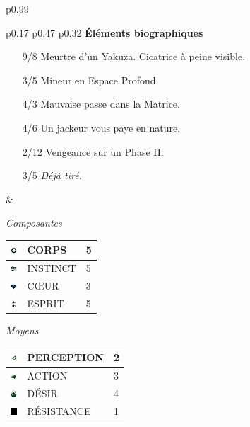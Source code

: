 \documentclass[11pt,twoside,a4paper]{article}
\def\imgCORPS{\includegraphics[width=0.25cm]{../../../../../imgGraphics/rolePlayingGame/SimulacreS/mini12x12/corps.png} }
\def\imgINSTI{\includegraphics[width=0.25cm]{../../../../../imgGraphics/rolePlayingGame/SimulacreS/mini12x12/instinct.png} }
\def\imgCOEUR{\includegraphics[width=0.25cm]{../../../../../imgGraphics/rolePlayingGame/SimulacreS/mini12x12/coeur.png} }
\def\imgESPRI{\includegraphics[width=0.25cm]{../../../../../imgGraphics/rolePlayingGame/SimulacreS/mini12x12/esprit.png} }
\def\imgPERCE{\includegraphics[width=0.25cm]{../../../../../imgGraphics/rolePlayingGame/SimulacreS/mini12x12/perception.png} }
\def\imgACTIO{\includegraphics[width=0.25cm]{../../../../../imgGraphics/rolePlayingGame/SimulacreS/mini12x12/action.png} }
\def\imgDESIR{\includegraphics[width=0.25cm]{../../../../../imgGraphics/rolePlayingGame/SimulacreS/mini12x12/desir.png} }
\def\imgRESIS{\includegraphics[width=0.25cm]{../../../../../imgGraphics/rolePlayingGame/SimulacreS/mini12x12/resistance.png} }
\begin{document}
\begin{longtable}[ht]{ p{} }
\begin{tabular}[h]{ p{} p{} p{} }
		\textbf{{\'E}l{\'e}ments biographiques}
		\begin{itemize}
			\item[9/8] Meurtre d'un Yakuza. Cicatrice {\`a} peine visible. 
			\item[3/5] Mineur en Espace Profond. 
			\item[4/3] Mauvaise passe dans la Matrice. 
			\item[4/6] Un jackeur vous paye en nature. 
			\item[2/12] Vengeance sur un Phase II. 
			\item[3/5] \emph{D{\'e}j{\`a} tir{\'e}. }
		\end{itemize}
		
		& %
		
			{\centering \emph{Composantes}}	\newline
				{\footnotesize %
				\begin{tabular}[h]{|p{0.25cm}|p{3.00cm}|p{0.75cm}|}
					\hline
					\imgCORPS & CORPS		&	5	\\
					\hline
					\imgINSTI & INSTINCT	&	5	\\
					\hline
					\imgCOEUR & C\OE UR		&	3	\\
					\hline
					\imgESPRI & ESPRIT		&	5	\\
					\hline
				\end{tabular} }
			\newline
			
			{\centering \emph{Moyens}} \newline
				{\footnotesize %
				\begin{tabular}[h]{|p{0.25cm}|p{3.00cm}|p{0.75cm}|}
					\hline
					\imgPERCE &  PERCEPTION		 & 2 \\
					\hline
					\imgACTIO &  ACTION			 & 3 \\
					\hline
					\imgDESIR &  D{\'E}SIR		 & 4 \\
					\hline
					\imgRESIS &  R{\'E}SISTANCE	 & 1 \\
					\hline
				\end{tabular} }
			\newline
			

\end{tabular}
\end{longtable}
\end{document}
